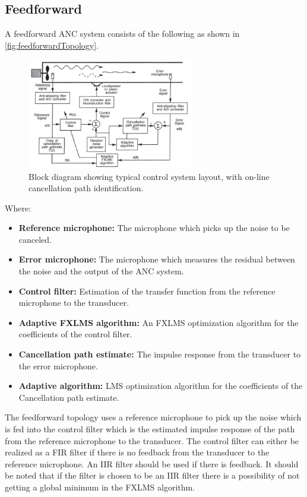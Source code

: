 \subsection*{Feedforward}
A feedforward ANC system consists of the following as shown in \autoref{fig:feedforwardTopology}.
\begin{figure}[H]
	\centering
	\includegraphics[width=0.65\textwidth]{figures/BasicSystem/feedforward}
	\caption{Block diagram showing typical control system layout, with on-line cancellation path identification. \cite{Hansen2}}
	\label{fig:feedforwardTopology}
\end{figure}
Where:
\begin{itemize}
\item \textbf{Reference microphone:} The microphone which picks up the noise to be canceled. 
\item \textbf{Error microphone:} The microphone which measures the residual between the noise and the output of the ANC system.
\item \textbf{Control filter:} Estimation of the transfer function from the reference microphone to the transducer. 
\item \textbf{Adaptive FXLMS algorithm:} An FXLMS optimization algorithm for the coefficients of the control filter.
\item \textbf{Cancellation path estimate:} The impulse response from the transducer to the error microphone.
\item \textbf{Adaptive algorithm:} LMS optimization algorithm for the coefficients of the Cancellation path estimate.
\end{itemize}

The feedforward topology uses a reference microphone to pick up the noise which is fed into the control filter which is the estimated impulse response of the path from the reference microphone to the transducer. The control filter can either be realized as a FIR filter if there is no feedback from the transducer to the reference microphone. An IIR filter should be used if there is feedback. It should be noted that if the filter is chosen to be an IIR filter there is a possibility of not getting a global minimum in the FXLMS algorithm.

